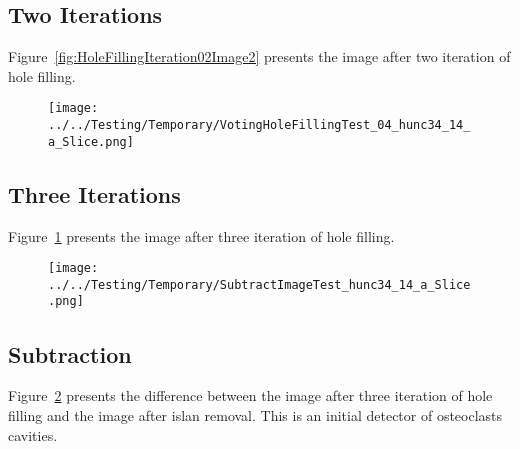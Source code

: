 \documentclass{InsightArticle}
\begin{document}
\subsection{Two Iterations}

Figure~\ref{fig:HoleFillingIteration02Image2} presents the image after two iteration of hole filling.



\clearpage
\begin{figure}
\center
\texttt{[image: ../../Testing/Temporary/VotingHoleFillingTest\_04\_hunc34\_14\_a\_Slice.png]}
\label{fig:HoleFillingIteration03Image3}
\end{figure}

\subsection{Three Iterations}

Figure~\ref{fig:HoleFillingIteration03Image3} presents the image after three iteration of hole filling.


\clearpage
\begin{figure}
\center
\texttt{[image: ../../Testing/Temporary/SubtractImageTest\_hunc34\_14\_a\_Slice.png]}
\label{fig:SubtractionImage}
\end{figure}

\subsection{Subtraction}

Figure~\ref{fig:SubtractionImage} presents the difference between the image
after three iteration of hole filling and the image after islan removal. This
is an initial detector of osteoclasts cavities.


%
%



\end{document}

